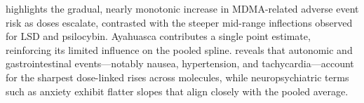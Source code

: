 

 highlights the gradual, nearly monotonic increase in MDMA-related adverse event risk as doses escalate, contrasted with the steeper mid-range inflections observed for LSD and psilocybin. Ayahuasca contributes a single point estimate, reinforcing its limited influence on the pooled spline.  reveals that autonomic and gastrointestinal events---notably nausea, hypertension, and tachycardia---account for the sharpest dose-linked rises across molecules, while neuropsychiatric terms such as anxiety exhibit flatter slopes that align closely with the pooled average.

